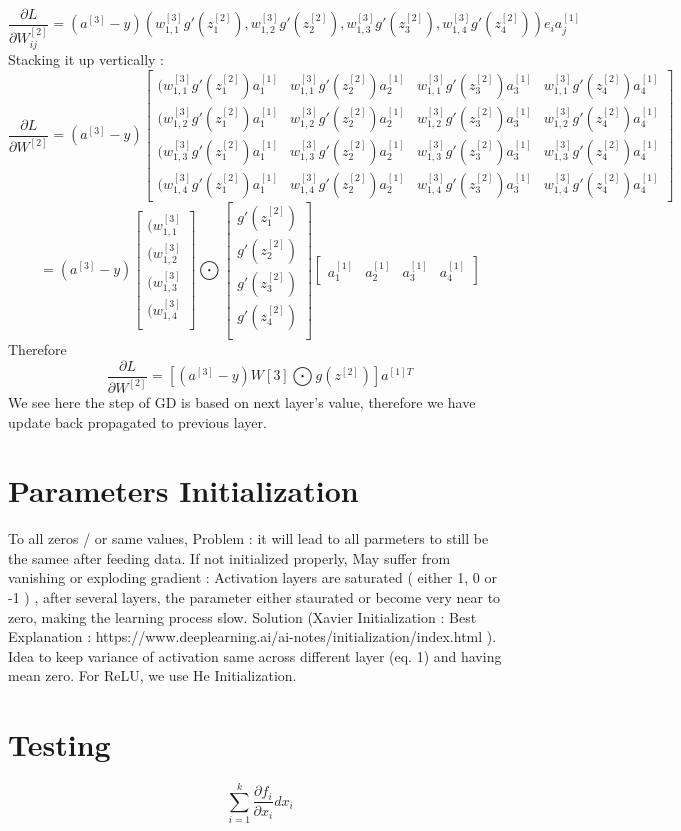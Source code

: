 \documentclass{article}
\begin{document}
\[
\frac{\partial L }{\partial W_{ij}^{[2]}} =  (a^{[3]}-y) (w_{1,1}^{[3]} g'(z_1^{[2]}),w_{1,2}^{[3]} g'(z_2^{[2]}),w_{1,3}^{[3]} g'(z_3^{[2]}),w_{1,4}^{[3]}g'(z_4^{[2]}))e_i a_j^{[1]} 
\]
Stacking it up vertically : 
\[
\frac{\partial L }{\partial W^{[2]}} =  (a^{[3]}-y) 
\begin{bmatrix}
(w_{1,1}^{[3]} g'(z_1^{[2]})a_1^{[1]} & w_{1,1}^{[3]} g'(z_2^{[2]})a_2^{[1]} & w_{1,1}^{[3]} g'(z_3^{[2]})a_3^{[1]} & w_{1,1}^{[3]}g'(z_4^{[2]})a_4^{[1]} \\
 (w_{1,2}^{[3]} g'(z_1^{[2]})a_1^{[1]} & w_{1,2}^{[3]} g'(z_2^{[2]})a_2^{[1]} & w_{1,2}^{[3]} g'(z_3^{[2]})a_3^{[1]} & w_{1,2}^{[3]}g'(z_4^{[2]})a_4^{[1]} \\
 (w_{1,3}^{[3]} g'(z_1^{[2]})a_1^{[1]} & w_{1,3}^{[3]} g'(z_2^{[2]})a_2^{[1]} & w_{1,3}^{[3]} g'(z_3^{[2]})a_3^{[1]} & w_{1,3}^{[3]}g'(z_4^{[2]})a_4^{[1]} \\
 (w_{1,4}^{[3]} g'(z_1^{[2]})a_1^{[1]} & w_{1,4}^{[3]} g'(z_2^{[2]})a_2^{[1]} & w_{1,4}^{[3]} g'(z_3^{[2]})a_3^{[1]} & w_{1,4}^{[3]}g'(z_4^{[2]})a_4^{[1]} 
\end{bmatrix} 
\]
 \[
 =  (a^{[3]}-y) 
\begin{bmatrix}
(w_{1,1}^{[3]} \\
(w_{1,2}^{[3]} \\
(w_{1,3}^{[3]} \\
(w_{1,4}^{[3]} \\
\end{bmatrix} 
\bigodot
\begin{bmatrix}
g'(z_1^{[2]}) \\
g'(z_2^{[2]})\\
g'(z_3^{[2]}) \\
g'(z_4^{[2]}) \\
\end{bmatrix} 
\begin{bmatrix}
a_1^{[1]} & a_2^{[1]} & a_3^{[1]} & a_4^{[1]} 
\end{bmatrix} 
\]
Therefore
\[
\frac{\partial L }{\partial W^{[2]}} = [ (a^{[3]}-y)W[3] \bigodot g(z^{[2]}) ] a^{[1]T} 
\]
We see here the step of GD is based on next layer's value, therefore we have update back propagated to previous layer.
\section{Parameters Initialization}
To all zeros / or same values, Problem : it will lead to all parmeters to still be the samee after feeding data. \newline
If not initialized properly, May suffer from vanishing or exploding gradient : Activation layers are saturated ( either 1, 0 or -1 ) , after several layers, the parameter either staurated or become very near to zero, making the learning process slow. \newline
Solution (Xavier Initialization : Best Explanation : https://www.deeplearning.ai/ai-notes/initialization/index.html ). \newline
Idea to keep variance of activation same across different layer (eq. 1) and having mean zero. \newline
For ReLU, we use He Initialization.
\section{Testing}
\[
\sum_{i=1}^k \frac{\partial f_i}{\partial x_i} dx_i
\]
\end{document}
